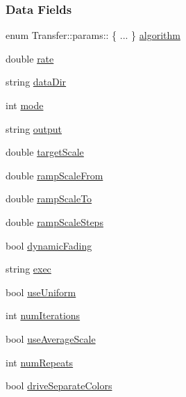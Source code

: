 \subsubsection*{\-Data \-Fields}
\begin{DoxyCompactItemize}
\item 
enum \-Transfer\-::params\-:: \{ ... \}  \hyperlink{structTransfer_1_1params_a2bde9247dba1e13abe50d263694ee117}{algorithm}
\item 
double \hyperlink{structTransfer_1_1params_a48c0856f52d8d42daf2cc99efde9b2c0}{rate}
\item 
string \hyperlink{structTransfer_1_1params_a305d2e159f190d71e25457e9852bb205}{data\-Dir}
\item 
int \hyperlink{structTransfer_1_1params_a67c677a5a9d7bb1b8cb741d1aaa8c603}{mode}
\item 
string \hyperlink{structTransfer_1_1params_af22b8085280fc3e5da2aaf3ef69d677a}{output}
\item 
double \hyperlink{structTransfer_1_1params_a1767c616d1cd8a1860a9d7e348a6a289}{target\-Scale}
\item 
double \hyperlink{structTransfer_1_1params_a5ebf2d115693b283690750ae0ebb74a1}{ramp\-Scale\-From}
\item 
double \hyperlink{structTransfer_1_1params_a41039b9de80c33d6ca6d92be0d2a9925}{ramp\-Scale\-To}
\item 
double \hyperlink{structTransfer_1_1params_a4aaa650f27fe2fd6444e1b287ab3200a}{ramp\-Scale\-Steps}
\item 
bool \hyperlink{structTransfer_1_1params_a391d76b47be4b0996aa94de22790d81b}{dynamic\-Fading}
\item 
string \hyperlink{structTransfer_1_1params_a91686c048a12d374d1616b96ba9b5e63}{exec}
\item 
bool \hyperlink{structTransfer_1_1params_ae7a3ce6f3514901c432d9d832cd3d298}{use\-Uniform}
\item 
int \hyperlink{structTransfer_1_1params_aa8372e01e8ed03084ec71d6f282b4f6f}{num\-Iterations}
\item 
bool \hyperlink{structTransfer_1_1params_ade55fea01590e5359dcbef2c992d69a5}{use\-Average\-Scale}
\item 
int \hyperlink{structTransfer_1_1params_af20699ffe52aa14ade65468c077717f8}{num\-Repeats}
\item 
bool \hyperlink{structTransfer_1_1params_a56f76776395b1cfae2956c8da180c18a}{drive\-Separate\-Colors}
\end{DoxyCompactItemize}


